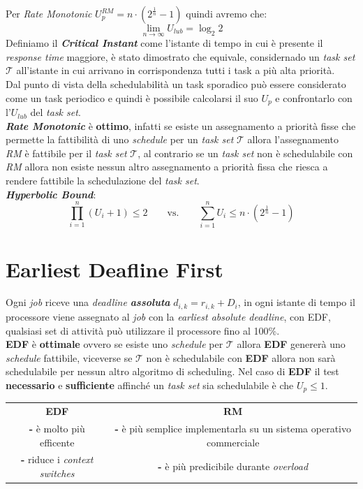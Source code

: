 Per \textit{Rate Monotonic} $U_p^{RM} = n \cdot (2^{\frac{1}{n}} - 1)$ quindi avremo che: \[ \lim_{n\to\infty} U_{lub} = \log_2 2\]
Definiamo il \textbf{\textit{Critical Instant}} come l'istante di tempo in cui è presente il \textit{response time} maggiore, è stato dimostrato che equivale, considernado un \textit{task set} $\mathcal{T}$ all'istante in cui arrivano in corrispondenza tutti i task a più alta priorità. \\
Dal punto di vista della schedulabilità un task sporadico può essere considerato come un task periodico e quindi è possibile calcolarsi il suo $U_p$ e confrontarlo con l'$U_{lub}$ del \textit{task set}. \\
\textbf{\textit{Rate Monotonic}} è \textbf{ottimo}, infatti se esiste un assegnamento a priorità fisse che permette la fattibilità di uno \textit{schedule} per un \textit{task set} $\mathcal{T}$ allora l'assegnamento \textit{RM} è fattibile per il \textit{task set} $\mathcal{T}$, al contrario se un \textit{task set} non è schedulabile con \textit{RM} allora non esiste nessun altro assegnamento a priorità fissa che riesca a rendere fattibile la schedulazione del \textit{task set}. \\
\textbf{\textit{Hyperbolic Bound}}: \[ \prod_{i=1}^n (U_i + 1) \leq 2 \qquad \text{vs.} \qquad \sum_{i=1}^n U_i \leq n \cdot (2^{\frac{1}{n}} - 1)\]

\section{Earliest Deafline First}
Ogni \textit{job} riceve una \textit{deadline \textbf{assoluta}} $d_{i,k} = r_{i,k} + D_i$, in ogni istante di tempo il processore viene assegnato al \textit{job} con la \textit{earliest absolute deadline}, con EDF, qualsiasi set di attività può utilizzare il processore fino al 100\%. \\
\textbf{EDF} è \textbf{ottimale} ovvero se esiste uno \textit{schedule} per $\mathcal{T}$ allora \textbf{EDF} genererà uno \textit{schedule} fattibile, viceverse se $\mathcal{T}$ non è schedulabile con \textbf{EDF} allora non sarà schedulabile per nessun altro algoritmo di scheduling.
Nel caso di \textbf{EDF} il test \textbf{necessario} e \textbf{sufficiente} affinché un \textit{task set} sia schedulabile è che $U_p \leq 1$.
\begin{center}
    \begin{tabular}{ c | c } 
        \textbf{EDF} & \textbf{RM} \\
        \textbf{-} è molto più efficente & \textbf{-} è più semplice implementarla su un sistema operativo commerciale \\ 
        \textbf{-} riduce i \textit{context switches} & \textbf{-} è più predicibile durante \textit{overload} \\
    \end{tabular}
\end{center}

